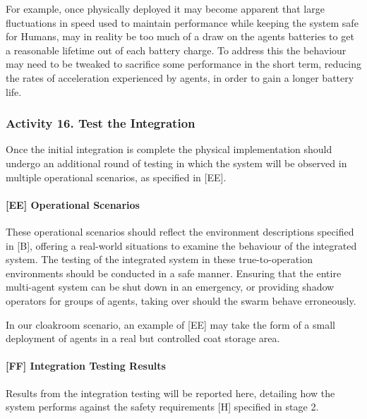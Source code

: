 \documentclass[lettersize,journal]{IEEEtran}
\begin{document}
For example, once physically deployed it may become apparent that large fluctuations in speed used to maintain performance while keeping the system safe for Humans, may in reality be too much of a draw on the agents batteries to get a reasonable lifetime out of each battery charge. To address this the behaviour may need to be tweaked to sacrifice some performance in the short term, reducing the rates of acceleration experienced by agents, in order to gain a longer battery life.

\subsubsection*{Activity 16. Test the Integration}

Once the initial integration is complete the physical implementation should undergo an additional round of testing in which the system will be observed in multiple operational scenarios, as specified in [EE].

\paragraph*{[EE] Operational Scenarios}

These operational scenarios should reflect the environment descriptions specified in [B], offering a real-world situations to examine the behaviour of the integrated system. The testing of the integrated system in these true-to-operation environments should be conducted in a safe manner. Ensuring that the entire multi-agent system can be shut down in an emergency, or providing shadow operators for groups of agents, taking over should the swarm behave erroneously.

In our cloakroom scenario, an example of [EE] may take the form of a small deployment of agents in a real but controlled coat storage area.




\paragraph*{[FF] Integration Testing Results}

Results from the integration testing will be reported here, detailing how the system performs against the safety requirements [H] specified in stage 2.
\end{document}
